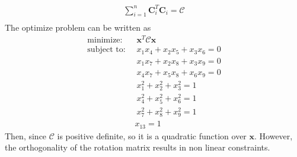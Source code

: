 \documentclass[a4paper]{report}
\begin{document}
\begin{align}
\sum_{i=1}^{n}\mathbf{C}_i^T\mathbf{C}_i = \mathcal{C}\\
\end{align}
The optimize problem can be written as
\begin{align}
\text{minimize: }& \ \mathbf{x}^T\mathcal{C}\mathbf{x}\\
\text{subject to: }& \ x_1x_4+x_2x_5+x_3x_6 = 0 \\
& \ x_1x_7+x_2x_8+x_3x_9 = 0 \\
& \ x_4x_7+x_5x_8+x_6x_9 = 0 \\
& \ x_1^2+x_2^2+x_3^2 = 1 \\
& \ x_4^2+x_5^2+x_6^2 = 1 \\
& \ x_7^2+x_8^2+x_9^2 = 1 \\
& x_{13} = 1
\end{align}
Then, since 
$\mathcal{C}$ is positive definite, so it is a quadratic function over $\mathbf{x}$. However, the orthogonality of the rotation matrix results in non linear constraints. 
\end{document}
